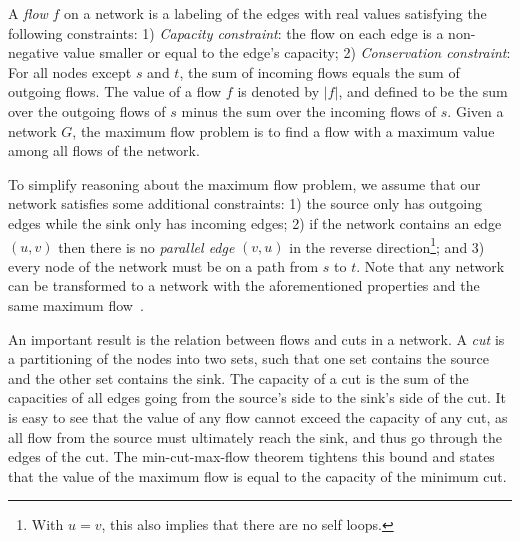 \documentclass[smallcondensed]{svjour3}     %
\begin{document}
A \emph{flow} $f$ on a network is a labeling of the edges with real values satisfying the following constraints: 1) \emph{Capacity constraint}: the flow on each edge is a non-negative value smaller or equal to the edge's capacity; 2) \emph{Conservation constraint}: For all nodes except $s$ and $t$, the sum of incoming flows equals the 
sum of outgoing flows.
% 
The value of a flow $f$ is denoted by $|f|$, and defined to be the sum over the outgoing flows of $s$ minus the sum over the incoming flows of $s$.
Given a network $G$, the maximum flow problem is to find a flow with a maximum value among all flows of the network. 

To simplify reasoning about the maximum flow problem, we assume that our network satisfies some additional constraints: 1) the source only has outgoing edges while the sink only has incoming edges; 2) if the network contains an edge $(u, v)$ then there is no \emph{parallel edge} $(v, u)$ in the reverse direction\footnote{With $u=v$, this also implies that there are no self loops.}; and 3) every node of the network must be on a path from $s$ to $t$. Note that any network can be transformed to a network with the aforementioned properties and the same maximum flow~\cite{CLRS09}.


An important result is the relation between flows and cuts in a network. A \emph{cut} is a partitioning of the nodes into two sets, such that one set contains 
the source and the other set contains the sink. The capacity of a cut is the sum of the capacities of all edges going from the source's side to the sink's side of the cut.
It is easy to see that the value of any flow cannot exceed the capacity of any cut, as all flow from the source must ultimately reach the sink, and thus go through the edges of the cut. The min-cut-max-flow theorem tightens this bound and states that the value of the maximum flow is equal to the capacity of the minimum cut.
\end{document}
